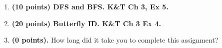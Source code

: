 \documentclass{article}
\begin{document}
\begin{enumerate}[noitemsep,topsep=0pt]
  \begin{enumerate}
  \item 
  \item 
  \item 
  \end{enumerate}


\medskip
\item \textbf{(10 points) DFS and BFS. K\&T Ch 3, Ex 5.} 


\bigskip
\item  \textbf{(20 points) Butterfly ID. K\&T Ch 3 Ex 4.}

\medskip
\item \textbf{(0 points).} How long did it take you to complete this assignment?

\end{enumerate}
\end{document}
